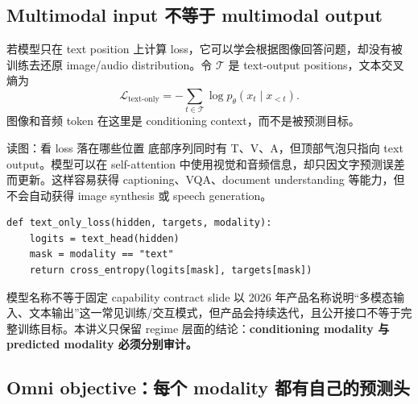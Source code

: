 
\subsection{Multimodal input 不等于 multimodal output}

若模型只在 text position 上计算 loss，它可以学会根据图像回答问题，却没有被训练去还原 image/audio distribution。令 $\mathcal{T}$ 是 text-output positions，文本交叉熵为
$$
\mathcal{L}_{\text{text-only}}
=-\sum_{t\in\mathcal{T}}\log p_\theta(x_t\mid x_{<t}).
$$
图像和音频 token 在这里是 conditioning context，而不是被预测目标。


\begin{knowledgebox}{读图：看 loss 落在哪些位置}
底部序列同时有 T、V、A，但顶部气泡只指向 text output。模型可以在 self-attention 中使用视觉和音频信息，却只因文字预测误差而更新。这样容易获得 captioning、VQA、document understanding 等能力，但不会自动获得 image synthesis 或 speech generation。
\end{knowledgebox}

\begin{lstlisting}[caption={只对文本输出位置计算交叉熵}]
def text_only_loss(hidden, targets, modality):
    logits = text_head(hidden)
    mask = modality == "text"
    return cross_entropy(logits[mask], targets[mask])
\end{lstlisting}


\begin{warningbox}{模型名称不等于固定 capability contract}
slide 以 2026 年产品名称说明“多模态输入、文本输出”这一常见训练/交互模式，但产品会持续迭代，且公开接口不等于完整训练目标。本讲义只保留 regime 层面的结论：\textbf{conditioning modality 与 predicted modality 必须分别审计。}
\end{warningbox}

\subsection{Omni objective：每个 modality 都有自己的预测头}

